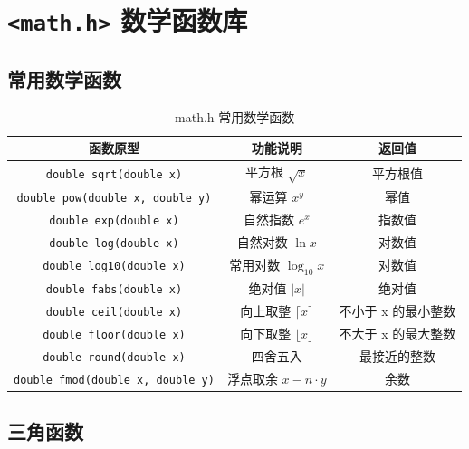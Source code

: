 \section{\texorpdfstring{\texttt{<math.h>} 数学函数库}{<math.h> 数学函数库}}

\subsection{常用数学函数}

\begin{table}[H]
\centering
\small
\renewcommand{\arraystretch}{1.6}
\begin{tabulary}{\linewidth}{CCC}
\toprule
\textbf{函数原型} & \textbf{功能说明} & \textbf{返回值} \\ \midrule
\texttt{double sqrt(double x)} & 平方根 $\sqrt{x}$ & 平方根值 \\ 
\texttt{double pow(double x, double y)} & 幂运算 $x^y$ & 幂值 \\ 
\texttt{double exp(double x)} & 自然指数 $e^x$ & 指数值 \\ 
\texttt{double log(double x)} & 自然对数 $\ln x$ & 对数值 \\ 
\texttt{double log10(double x)} & 常用对数 $\log_{10} x$ & 对数值 \\ 
\texttt{double fabs(double x)} & 绝对值 $|x|$ & 绝对值 \\ 
\texttt{double ceil(double x)} & 向上取整 $\lceil x \rceil$ & 不小于 x 的最小整数 \\ 
\texttt{double floor(double x)} & 向下取整 $\lfloor x \rfloor$ & 不大于 x 的最大整数 \\ 
\texttt{double round(double x)} & 四舍五入 & 最接近的整数 \\ 
\texttt{double fmod(double x, double y)} & 浮点取余 $x - n \cdot y$ & 余数 \\ \bottomrule
\end{tabulary}
\caption{math.h 常用数学函数}
\label{tab:math_funcs}
\end{table}

\subsection{三角函数}


